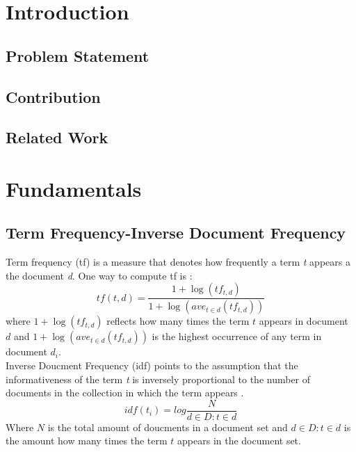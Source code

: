 \documentclass[a4paper, 11pt,titlepage,oneside,openany]{book}
\begin{document}

\chapter{Introduction}

\section{Problem Statement}
 
 

\section{Contribution}

 

\section{Related Work}

\chapter{Fundamentals}

\section{Term Frequency-Inverse Document Frequency}
Term frequency (\gls{tf}) is a measure that denotes how frequently a term \textit{t} appears a the document \textit{d}. One way to compute \gls{tf} is \cite{IR-book}:\\
\[
tf(t,d)=\frac{1+\log(tf_{t,d})}{1+\log(ave_{t\in d}(tf_{t,d}))}
\]
where $1+\log(tf_{t,d})$ reflects how many times the term $t$ appears in document $d$ and $1+\log(ave_{t\in d}(tf_{t,d}))$ is the highest occurrence of any term in document $d_i$.\\

\noindent Inverse Doucment Frequency (\gls{idf}) points to the assumption that the informativeness of the term \textit{t} is inversely proportional to the number of documents in the collection in which the term appears \cite{IR-book}.\\
\[
idf(t_i)=log\frac{N}{d \in D : t \in d}
\]
Where $N$ is the total amount of doucments in a document set and $d \in D : t \in d$ is the amount how many times the term $t$ appears in the document set.\\
\end{document}
